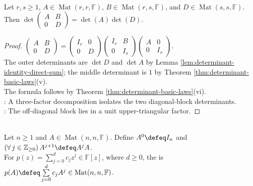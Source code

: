 \begin{theorem} \label{thm:block-upper-triangular-determinant} \\
Let $r,s\geq1$, $A\in\operatorname{Mat}(r,r,\mathbb{F})$, $B\in\operatorname{Mat}(r,s,\mathbb{F})$, and $D\in\operatorname{Mat}(s,s,\mathbb{F})$.\\
Then $\det\left(\begin{smallmatrix}A&B\\0&D\end{smallmatrix}\right)=\det(A)\det(D)$.
\begin{proof}
$\left(\begin{smallmatrix}A&B\\0&D\end{smallmatrix}\right)=\left(\begin{smallmatrix}I_r&0\\0&D\end{smallmatrix}\right)\left(\begin{smallmatrix}I_r&B\\0&I_s\end{smallmatrix}\right)\left(\begin{smallmatrix}A&0\\0&I_s\end{smallmatrix}\right)$.\\
The outer determinants are $\det D$ and $\det A$ by Lemma \ref{lem:determinant-identity-direct-sum}; the middle determinant is $1$ by Theorem \ref{thm:determinant-basic-laws}(v).\\
The formula follows by Theorem \ref{thm:determinant-basic-laws}(vi).\\
: A three-factor decomposition isolates the two diagonal-block determinants.\\
: The off-diagonal block lies in a unit upper-triangular factor.
\end{proof}
\end{theorem}

\begin{definition} \label{def:polynomial-evaluation-on-square-matrix} \\
Let $n\geq1$ and $A\in\operatorname{Mat}(n,n,\mathbb{F})$. Define $A^0\defeq I_n$ and $(\forall\,j\in\mathbb{Z}_{\geq0})\,A^{j+1}\defeq A^jA$.\\
For $p(z)=\sum\limits_{j=0}^{d}c_jz^j\in\mathbb{F}[z]$, where $d\geq0$, the  is $p(A)\defeq\sum\limits_{j=0}^{d}c_jA^j\in\operatorname{Mat}(n,n,\mathbb{F})$.
\end{definition}

